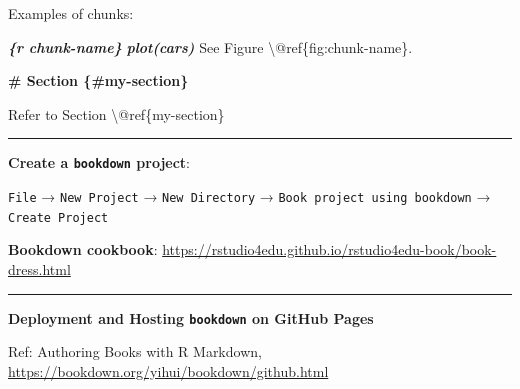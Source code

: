 \documentclass[
  a4paper,
  twoside,
  openright]{book}
\newenvironment{Shaded}{\begin{snugshade}}{\end{snugshade}}
\newcommand{\FunctionTok}[1]{\textcolor[rgb]{0.13,0.29,0.53}{\textbf{#1}}}
\newcommand{\InformationTok}[1]{\textcolor[rgb]{0.56,0.35,0.01}{\textbf{\textit{#1}}}}
\newcommand{\NormalTok}[1]{#1}
\theoremstyle{definition}
\theoremstyle{definition}
\theoremstyle{definition}
\theoremstyle{definition}
\theoremstyle{remark}
\begin{document}
Examples of chunks:

\begin{Shaded}
\begin{Highlighting}[]
\InformationTok{\textasciigrave{}\textasciigrave{}\textasciigrave{}\{r chunk{-}name\}}
\InformationTok{plot(cars)}
\InformationTok{\textasciigrave{}\textasciigrave{}\textasciigrave{}} 
\NormalTok{See Figure \textbackslash{}@ref\{fig:chunk{-}name\}.}
\end{Highlighting}
\end{Shaded}

\begin{Shaded}
\begin{Highlighting}[]
\FunctionTok{\# Section \{\#my{-}section\}}

\NormalTok{Refer to Section \textbackslash{}@ref\{my{-}section\}}
\end{Highlighting}
\end{Shaded}

\begin{center}\rule{0.5\linewidth}{0.5pt}\end{center}

\textbf{Create a \texttt{bookdown} project}:

\texttt{File} → \texttt{New\ Project} → \texttt{New\ Directory} → \texttt{Book\ project\ using\ bookdown} → \texttt{Create\ Project}

\textbf{Bookdown cookbook}: \url{https://rstudio4edu.github.io/rstudio4edu-book/book-dress.html}

\begin{center}\rule{0.5\linewidth}{0.5pt}\end{center}

\textbf{Deployment and Hosting \texttt{bookdown} on GitHub Pages}

Ref: Authoring Books with R Markdown, \url{https://bookdown.org/yihui/bookdown/github.html}
\end{document}
